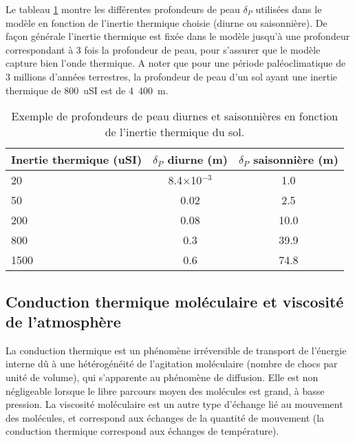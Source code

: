 Le tableau \ref{tab:IT} montre les différentes profondeurs de peau $\delta_{P}$ utilisées dans le modèle en fonction de l’inertie thermique choisie (diurne ou saisonnière). De façon générale l'inertie thermique est fixée dans le modèle jusqu'à une profondeur correspondant à 3 fois la profondeur de peau, pour s’assurer que le modèle capture bien l’onde thermique. A noter que pour une période paléoclimatique de 3 millions d’années terrestres, la profondeur de peau d’un sol ayant une inertie thermique de 800~uSI est de 4~400~m.

\begin{table}
\begin{center}
\begin{tabular}{|l|c|c|}
\hline
Inertie thermique (uSI) & $\delta_P$ diurne (m) & $\delta_P$ saisonnière (m) \\
\hline
20 & 8.4$\times$10$^{-3}$ & 1.0 \\
50 & 0.02 & 2.5 \\
200 & 0.08 & 10.0 \\
800 & 0.3 & 39.9 \\
1500 & 0.6 & 74.8 \\
\hline
\end{tabular}
\end{center}
\caption{Exemple de profondeurs de peau diurnes et saisonnières en fonction de l’inertie thermique du sol.}
\label{tab:IT}
\end{table}

\subsection{Conduction thermique moléculaire et viscosité de l’atmosphère}
\label{sc:condvisc}

La conduction thermique est un phénomène irréversible de transport de l'énergie interne dû à une hétérogénéité de l'agitation moléculaire (nombre de chocs par unité de volume), qui s’apparente au phénomène de diffusion. Elle est non négligeable lorsque le libre parcours moyen des molécules est grand, à basse pression. 
La viscosité moléculaire est un autre type d’échange lié au mouvement des molécules, et correspond aux échanges de la quantité de mouvement (la conduction thermique correspond aux échanges de température). 

